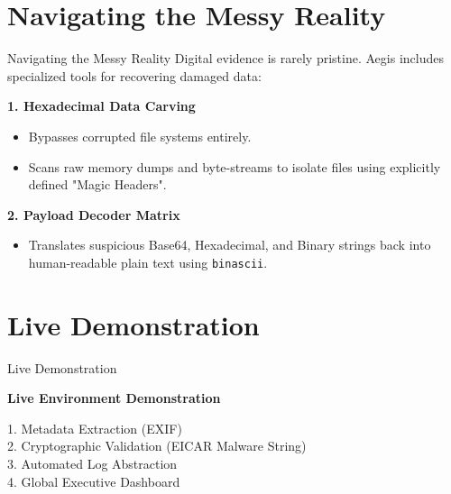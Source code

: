 \documentclass[aspectratio=169]{beamer}
\begin{document}
\section{Navigating the Messy Reality}

\begin{frame}{Navigating the Messy Reality}
    Digital evidence is rarely pristine. Aegis includes specialized tools for recovering damaged data:
    
    \vspace{0.5cm}
    \textbf{1. Hexadecimal Data Carving}
    \begin{itemize}
        \item Bypasses corrupted file systems entirely.
        \item Scans raw memory dumps and byte-streams to isolate files using explicitly defined "Magic Headers".
    \end{itemize}
    
    \vspace{0.3cm}
    \textbf{2. Payload Decoder Matrix}
    \begin{itemize}
        \item Translates suspicious Base64, Hexadecimal, and Binary strings back into human-readable plain text using \texttt{binascii}.
    \end{itemize}
\end{frame}

\section{Live Demonstration}

\begin{frame}{Live Demonstration}
    \begin{center}
        \Large \textbf{Live Environment Demonstration}
        
        \vspace{0.5cm}
        \normalsize
        1. Metadata Extraction (EXIF)\\
        2. Cryptographic Validation (EICAR Malware String)\\
        3. Automated Log Abstraction\\
        4. Global Executive Dashboard
    \end{center}
\end{frame}

\end{document}
